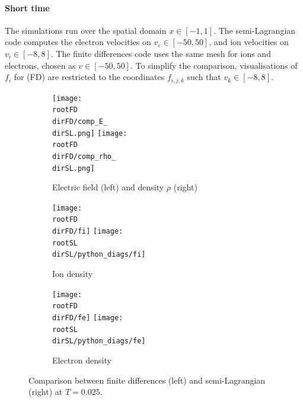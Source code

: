 \documentclass{article}
\numberwithin{equation}{section}
\newcommand{\imh}{\textwidth} %
\begin{document}
\paragraph{Short time}

The simulations run over the spatial domain $x \in [-1,1]$. The semi-Lagrangian code computes the electron velocities on $v_e \in [-50, 50]$, and ion velocities on $v_i \in [-8, 8]$. The finite differences code uses the same mesh for ions and electrons, chosen as $v\in[-50,50]$. To simplify the comparison, visualisations of $f_i$ for (FD) are restricted to the coordinates $f_{i,j,k}$ such that $v_k \in [-8,8]$.

\begin{figure}
	\centering
	\newcommand{\rootSL}{../code_SL/}
	\newcommand{\rootFD}{../temp_res_DF/}
	\newcommand{\dirSL}{run_comp_short_time_2sp_Nx1000_Nvi2001_Nve2001_Nt1563}
	\newcommand{\dirFD}{run_comp_short_time_2sp_Nx1000_Nv2000_Nt1563}
	\renewcommand{\imh}{0.33\linewidth}
	
	\begin{subfigure}{\textwidth}
		\centering
		\texttt{[image: \\rootFD\\dirFD/comp\_E\_\\dirSL.png]}
		\texttt{[image: \\rootFD\\dirFD/comp\_rho\_\\dirSL.png]}
		\caption{Electric field (left) and density $\rho$ (right)}
		\label{subfig:compT0025_E_rho}
	\end{subfigure}
	
	\begin{subfigure}{\textwidth}
		\centering
		\texttt{[image: \\rootFD\\dirFD/fi]}
		\texttt{[image: \\rootSL\\dirSL/python\_diags/fi]}
		\caption{Ion density}
		\label{subfig:compT0025_ion}
	\end{subfigure}
	\begin{subfigure}{\textwidth}
		\centering
		\texttt{[image: \\rootFD\\dirFD/fe]}
		\texttt{[image: \\rootSL\\dirSL/python\_diags/fe]}
		\caption{Electron density}
		\label{subfig:compT0025_electron}
	\end{subfigure}
	\caption{Comparison between finite differences (left) and semi-Lagrangian (right) at $T=0.025$.}
	\label{fig:compT0025}
\end{figure}  
\end{document}
